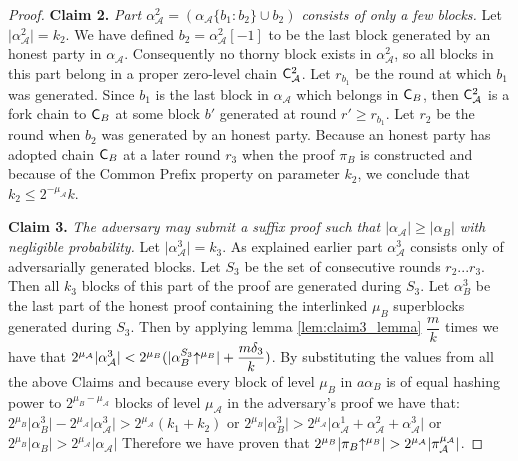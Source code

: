 \begin{proof}
\textbf{Claim 2.}
\textit{Part $\alpha_\mathcal{A}^2 = (\alpha_\mathcal{A}\{b_1:b_2\} \cup b_2)$ consists of only a few blocks.} Let $ \lvert \alpha_\mathcal{A}^2 \rvert = k_2$. We have defined $b_2 = \alpha_\mathcal{A}^2[-1]$ to be the last block generated by an honest party in $\alpha_\mathcal{A}$. Consequently no thorny block exists in $\alpha_\mathcal{A}^2$, so all blocks in this part belong in a proper zero-level chain $\mathsf{C}_\mathcal{A}^2$.  Let $r_{b_1}$ be the round at which $b_1$ was generated. Since $b_1$ is the last block in $\alpha_\mathcal{A}$ which belongs in $\mathsf{C}_B$, then $\mathsf{C}_\mathcal{A}^2$ is a fork chain to $\mathsf{C}_B$ at some block $b'$ generated at round $r' \geq r_{b_1}$. Let $r_2$ be the round when $b_2$ was generated by an honest party. Because an honest party has adopted chain $\mathsf{C}_B$ at a later round $r_3$ when the proof $\pi_B$ is constructed and because of the Common Prefix property on parameter $k_2$, we conclude that $k_2 \leq 2^{-\mu_\mathcal{A}}k$.

\textbf{Claim 3.} \textit{The adversary may submit a suffix proof such that $\lvert \alpha_\mathcal{A}\rvert \geq \lvert \alpha_B \rvert$ with negligible probability.} Let $ \lvert \alpha_\mathcal{A}^3 \rvert = k_3$. As explained earlier part $\alpha^3_\mathcal{A}$ consists only of adversarially generated blocks. Let $S_3$ be the set of consecutive rounds $r_2...r_3$. Then all $k_3$ blocks of this part of the proof are generated during $S_3$. Let $\alpha^{3}_B$ be the last part of the honest proof containing the interlinked $\mu_B$ superblocks generated during $S_3$. Then by applying lemma \ref{lem:claim3_lemma} $\dfrac{m}{k}$ times we have that $ 2^{\mu_\mathcal{A}}\lvert \alpha^3_\mathcal{A} \rvert < 2^{\mu_B} (\lvert \alpha^{S_3}_{B}\negthickspace\uparrow^{\mu_B} \rvert + \dfrac{m\delta_3}{k})$. By substituting the values from all the above Claims and because every block of level $\mu_B$ in $a\alpha_B$ is of equal hashing power to $2^{\mu_B - \mu_\mathcal{A}}$ blocks of level $\mu_\mathcal{A}$ in the adversary's proof we have that:
$2^{\mu_B} \lvert \alpha{_B^{3}} \rvert - 2^{\mu_\mathcal{A}} \lvert \alpha_\mathcal{A}^{3} \rvert > 2^{\mu_\mathcal{A}}(k_1 + k_2)$
or $2^{\mu_B} \lvert \alpha{_B^{3}} \rvert > 2^{\mu_\mathcal{A}} \lvert \alpha_\mathcal{A}^{1} + \alpha_\mathcal{A}^{2} + \alpha_\mathcal{A}^{3}\rvert $
or $2^{\mu_B} \lvert \alpha{_B} \rvert > 2^{\mu_\mathcal{A}} \lvert \alpha_\mathcal{A} \rvert $
Therefore we have proven that $2^{\mu_B} \lvert \pi_B \negthickspace\uparrow^{\mu_B} \rvert > 2^{\mu_\mathcal{A}} \lvert \pi_\mathcal{A}^{\mu_\mathcal{A}} \rvert$.
\end{proof}
